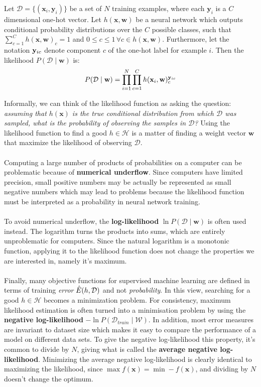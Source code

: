 \begin{definition}
	\label{likelihood}
	Let $\mathcal{D} = \{(\mathbf{x}_i, \mathbf{y}_i)\}$ be a set of $N$ training examples, where each $\mathbf{y}_i$ is a $C$ dimensional one-hot vector. Let $h(\mathbf{x}, \mathbf{w})$ be a neural network which outputs conditional probability distributions over the $C$ possible classes, such that $\sum_{c=1}^C h(\mathbf{x}, \mathbf{w})_c = 1$ and $0 \leq c \leq 1 \,\forall c \in h(\mathbf{x}, \mathbf{w})$. Furthermore, let the notation $\mathbf{y}_{ic}$ denote component $c$ of the one-hot label for example $i$. Then the likelihood $P(\mathcal{D} \mid \mathbf{w})$ is:
	$$
	P(\mathcal{D} \mid \mathbf{w}) = \prod\limits_{i=1}^N\prod\limits_{c=1}^C h(\mathbf{x}_i, \mathbf{w})_c^{\mathbf{y}_{ic}}
	$$
\end{definition}
\noindent
Informally, we can think of the likelihood function as asking the question: \textit{assuming that $h(\mathbf{x})$ is the true conditional distribution from which $\mathcal{D}$ was sampled, what is the probability of observing the samples in $\mathcal{D}$?} Using the likelihood function to find a good $h \in \mathcal{H}$ is a matter of finding a weight vector $\mathbf{w}$ that maximize the likelihood of observing $\mathcal{D}$.
\\\\ 
Computing a large number of products of probabilities on a computer can be problematic because of \textbf{numerical underflow}. Since computers have limited precision, small positive numbers may be actually be represented as small negative numbers which may lead to problems because the likelihood function must be interpreted as a probability in neural network training.
\\\\
To avoid numerical underflow, the \textbf{log-likelihood} $\ln P(\mathcal{D} \mid \mathbf{w})$ is often used instead. The logarithm turns the products into sums, which are entirely unproblematic for computers. Since the natural logarithm is a monotonic function, applying it to the likelihood function does not change the properties we are interested in, namely it's maximum.
\\\\
Finally, many objective functions for supervised machine learning are defined in terms of training \emph{error} $\hat{E}(h, \mathcal{D})$ and not \emph{probability}. In this view, searching for a good $h \in \mathcal{H}$ becomes a minimization problem. For consistency, maximum likelihood estimation is often turned into a minimisation problem by using the \textbf{negative log-likelihood} $-\ln P(\mathcal{D}_{train} \mid \mathcal{W})$. In addition, most error measures are invariant to dataset size which makes it easy to compare the performance of a model on different data sets. To give the negative log-likelihood this property, it's common to divide by $N$, giving what is called the \textbf{average negative log-likelihood}. Minimizing the average negative log-likelihood is clearly identical to maximizing the likelihood, since $\max f(\mathbf{x}) = \min -f(\mathbf{x})$, and dividing by $N$ doesn't change the optimum.

